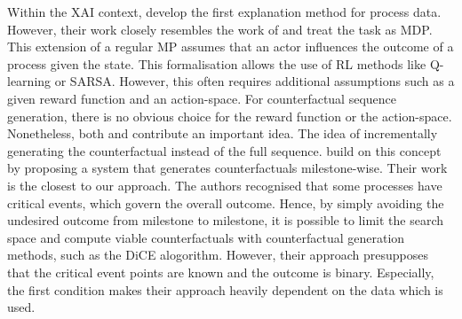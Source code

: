 \documentclass[./../../paper.tex]{subfiles}
\begin{document}
Within the \gls{XAI} context, \citeauthor{tsirtsis_CounterfactualExplanationsSequential_2021} develop the first explanation method for process data\autocite{tsirtsis_CounterfactualExplanationsSequential_2021}. However, their work closely resembles the work of \citeauthor{oberst_CounterfactualOffPolicyEvaluation_2019} and treat the task as \gls{MDP}\autocite{oberst_CounterfactualOffPolicyEvaluation_2019}. This extension of a regular \gls{MP} assumes that an actor influences the outcome of a process given the state. This formalisation allows the use of \gls{RL} methods like Q-learning or SARSA\needscite{}. However, this often requires additional assumptions such as a given reward function and an action-space. For counterfactual sequence generation, there is no obvious choice for the reward function or the action-space. Nonetheless, both \citeauthor{tsirtsis_CounterfactualExplanationsSequential_2021} and \citeauthor{oberst_CounterfactualOffPolicyEvaluation_2019} contribute an important idea. The idea of incrementally generating the counterfactual instead of the full sequence. \citeauthor{hsieh_DiCE4ELInterpretingProcess_2021} build on this concept by proposing a system that generates counterfactuals milestone-wise\autocite{hsieh_DiCE4ELInterpretingProcess_2021}. Their work is the closest to our approach. The authors recognised that some processes have critical events, which govern the overall outcome. Hence, by simply avoiding the undesired outcome from milestone to milestone, it is possible to limit the search space and compute viable counterfactuals with counterfactual generation methods, such as the DiCE alogorithm. However, their approach presupposes that the critical event points are known and the outcome is binary. Especially, the first condition makes their approach heavily dependent on the data which is used.
\end{document}

